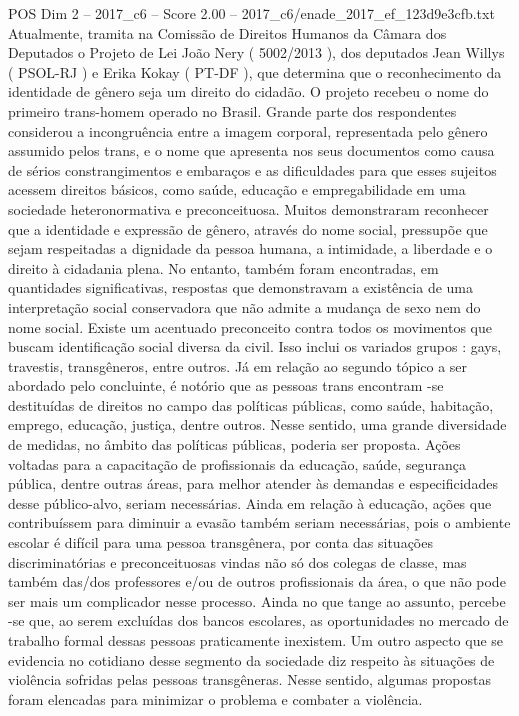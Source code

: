 \begin{textsample}{POS Dim 2 – 2017\_c6 – Score 2.00 – 2017\_c6/enade\_2017\_ef\_123d9e3cfb.txt}
Atualmente, tramita na Comissão de Direitos Humanos da Câmara dos Deputados o Projeto de Lei João Nery ( 5002/2013 ), dos deputados Jean Willys ( PSOL-RJ ) e Erika Kokay ( PT-DF ), que determina que o reconhecimento da identidade de gênero seja um direito do cidadão.
O projeto recebeu o nome do primeiro trans-homem operado no Brasil.
Grande parte dos respondentes considerou a incongruência entre a imagem corporal, representada pelo gênero assumido pelos trans, e o nome que apresenta nos seus documentos como causa de sérios constrangimentos e embaraços e as dificuldades para que esses sujeitos acessem direitos básicos, como saúde, educação e empregabilidade em uma sociedade heteronormativa e preconceituosa.
Muitos demonstraram reconhecer que a identidade e expressão de gênero, através do nome social, pressupõe que sejam respeitadas a dignidade da pessoa humana, a intimidade, a liberdade e o direito à cidadania plena.
No entanto, também foram encontradas, em quantidades significativas, respostas que demonstravam a existência de uma interpretação social conservadora que não admite a mudança de sexo nem do nome social.
Existe um acentuado preconceito contra todos os movimentos que buscam identificação social diversa da civil.
Isso inclui os variados grupos : gays, travestis, transgêneros, entre outros.
Já em relação ao segundo tópico a ser abordado pelo concluinte, é notório que as pessoas trans encontram -se destituídas de direitos no campo das políticas públicas, como saúde, habitação, emprego, educação, justiça, dentre outros.
Nesse sentido, uma grande diversidade de medidas, no âmbito das políticas públicas, poderia ser proposta.
Ações voltadas para a capacitação de profissionais da educação, saúde, segurança pública, dentre outras áreas, para melhor atender às demandas e especificidades desse público-alvo, seriam necessárias.
Ainda em relação à educação, ações que contribuíssem para diminuir a evasão também seriam necessárias, pois o ambiente escolar é difícil para uma pessoa transgênera, por conta das situações discriminatórias e preconceituosas vindas não só dos colegas de classe, mas também das/dos professores e/ou de outros profissionais da área, o que não pode ser mais um complicador nesse processo.
Ainda no que tange ao assunto, percebe -se que, ao serem excluídas dos bancos escolares, as oportunidades no mercado de trabalho formal dessas pessoas praticamente inexistem.
Um outro aspecto que se evidencia no cotidiano desse segmento da sociedade diz respeito às situações de violência sofridas pelas pessoas transgêneras.
Nesse sentido, algumas propostas foram elencadas para minimizar o problema e combater a violência.

\end{textsample}
